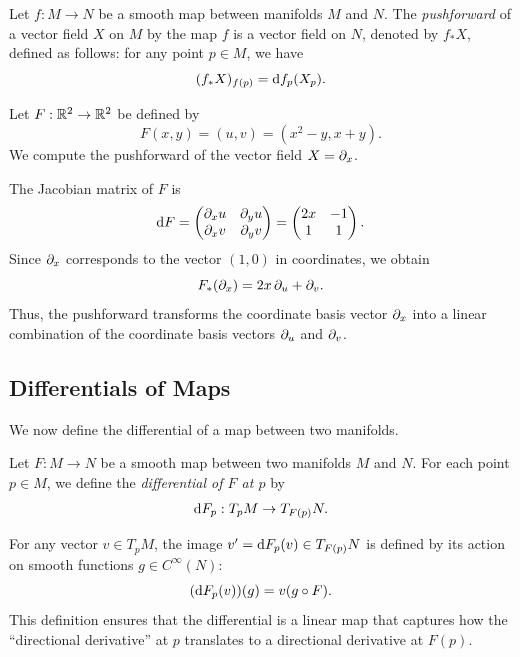 \begin{definition}
  Let $f : M \to N$ be a smooth map between manifolds $M$ and $N$. The \emph{pushforward} of a vector field $X$ on $M$ by the map $f$ is a vector field on $N$, denoted by $f_*X$, defined as follows: for any point $p \in M$, we have
  \[%
    (f_*X)_{f(p)} = \df_p(X_p)
  .\]%
\end{definition}

\begin{example}
  Let $F : \mathbb{R}^2 \rightarrow \mathbb{R}^2$ be defined by
  \[%
    F(x,y) = (u,v) = (x^2 - y, x + y)
  .\]%
  We compute the pushforward of the vector field $X = \pd{x}$.

  The Jacobian matrix of $F$ is
  \[%
    \dF = \begin{pmatrix}
      \pd{x} u & \pd{y} u \\
      \pd{x} v & \pd{y} v \\
    \end{pmatrix}
    = \begin{pmatrix}
      2x & -1 \\
      1 & 1 \\
    \end{pmatrix}
  .\]%
  Since $\pd{x}$ corresponds to the vector $(1,0)$ in coordinates, we obtain
  \[%
    F_*(\pd{x}) = 2x \pd{u} + \pd{v}
  .\]%
  Thus, the pushforward transforms the coordinate basis vector $\pd{x}$ into a linear combination of the coordinate basis vectors $\pd{u}$ and $\pd{v}$.
\end{example}


\subsection{Differentials of Maps} We now define the differential of a map between two manifolds.
\begin{definition}
  Let $F : M \to N$ be a smooth map between two manifolds $M$ and $N$. For each point $p \in M$, we define the \emph{differential of $F$ at $p$} by
  \[%
    \dF_p : T_pM \to T_{F(p)}N
  .\]%
\end{definition}


For any vector $v \in T_pM$, the image $v' = \dF_p(v) \in T_{F(p)}N$ is defined by its action on smooth functions $g \in C^\infty(N)$:
\[%
  (\dF_p(v))(g) = v(g \circ F)
.\]%
This definition ensures that the differential is a linear map that captures how the ``directional derivative'' at $p$ translates to a directional derivative at $F(p)$.

